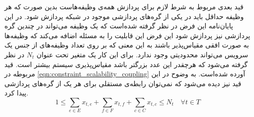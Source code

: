 	قید بعدی مربوط به شرط لازم برای پردازش همه‌ی وظیفه‌هاست بدین صورت که هر وظیفه حداقل باید در یکی از گره‌های پردازشی موجود در شبکه پردازش شود. در این پایان‌نامه این فرض در نظر گرفته شده‌است که یک وظیفه می‌تواند در چندین گره پردازشی نیز پردازش شود این فرض این قابلیت را به مسئله اضافه می‌کند که وظیفه‌ها به صورت افقی مقیاس‌پذیر باشند به این معنی که بر روی تعداد وظیفه‌های از جنس یک سرویس می‌تواند محدودیتی وجود ندارد. برای این کار یک متغیر تحت عنوان $N_t$ در نظر گرفته می‌شود که هرچقدر این عدد بزرگتر باشد مقیاس‌پذیری سیستم بیشتر است. قید مربوطه در \cref{eqn:constraint_scalability_coupling} آورده شده‌است. به وضوح در این قید نیز دیده می‌شود که نمی‌توان رابطه‌ی مستقلی برای هر یک از گره‌های پردازشی پیدا کرد. 
	\begin{equation}\label{eqn:constraint_scalability_coupling}
		1 \le \sum_{e \in E}x_{t,e} + \sum_{f \in F}x_{t,f} + \sum_{c \in C}x_{t,c} \le N_t \quad \forall{t \in T}
	\end{equation}
